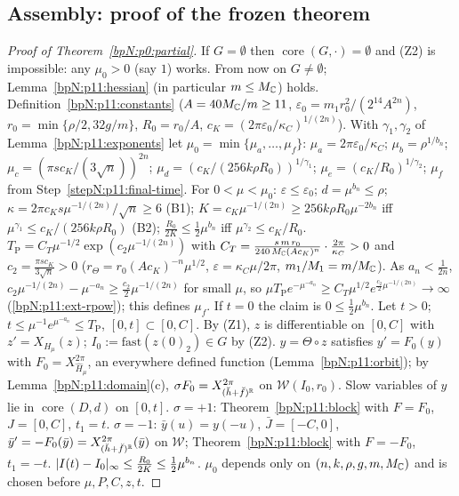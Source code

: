\subsection{Assembly: proof of the frozen theorem}\label{bpN:p11:s-final}

\begin{proof}[Proof of Theorem~\ref{bpN:p0:partial}]
\label{stepN:p11:final-empty} If $G=\emptyset$ then $\operatorname{core}(G,\cdot)=\emptyset$ and (Z2) is impossible: any $\mu_0>0$ (say $1$) works. From now on $G\ne\emptyset$; Lemma~\ref{bpN:p11:hessian} (in particular $m\le M_{\mathbb{C}}$) holds.
\label{stepN:p11:final-data} Definition~\ref{bpN:p11:constants} ($A=40M_{\mathbb{C}}/m\ge11$, $\varepsilon_0=m_1r_0^2/(2^{14}A^{2n})$, $r_0=\min\{\rho/2,32g/m\}$, $R_0=r_0/A$, $c_K=(2\pi\varepsilon_0/\kappa_C)^{1/(2n)}$).
\label{stepN:p11:final-mu} With $\gamma_1,\gamma_2$ of Lemma~\ref{bpN:p11:exponents} let $\mu_0=\min\{\mu_a,\dots,\mu_f\}$: $\mu_a=2\pi\varepsilon_0/\kappa_C$; $\mu_b=\rho^{1/b_n}$; $\mu_c=(\pi sc_K/(3\sqrt n))^{2n}$; $\mu_d=(c_K/(256k\rho R_0))^{1/\gamma_1}$; $\mu_e=(c_K/R_0)^{1/\gamma_2}$; $\mu_f$ from Step~\ref{stepN:p11:final-time}. For $0<\mu<\mu_0$: $\varepsilon\le\varepsilon_0$; $d=\mu^{b_n}\le\rho$; $\kappa=2\pi c_Ks\mu^{-1/(2n)}/\sqrt n\ge6$ (B1); $K=c_K\mu^{-1/(2n)}\ge256k\rho R_0\mu^{-2b_n}$ iff $\mu^{\gamma_1}\le c_K/(256k\rho R_0)$ (B2); $\frac{R_0}{2K}\le\frac12\mu^{b_n}$ iff $\mu^{\gamma_2}\le c_K/R_0$.
\label{stepN:p11:final-time} $T_{\mathrm P}=C_T\mu^{-1/2}\exp(c_2\mu^{-1/(2n)})$ with $C_T=\frac{s\,m\,r_0}{240\,M_{\mathbb{C}}(Ac_K)^n}\cdot\frac{2\pi}{\kappa_C}>0$ and $c_2=\frac{\pi sc_K}{3\sqrt n}>0$ ($r_\Theta=r_0(Ac_K)^{-n}\mu^{1/2}$, $\varepsilon=\kappa_C\mu/2\pi$, $m_1/M_1=m/M_{\mathbb{C}}$). As $a_n<\frac1{2n}$, $c_2\mu^{-1/(2n)}-\mu^{-a_n}\ge\frac{c_2}2\mu^{-1/(2n)}$ for small $\mu$, so $\mu T_{\mathrm P}e^{-\mu^{-a_n}}\ge C_T\mu^{1/2}e^{\frac{c_2}2\mu^{-1/(2n)}}\to\infty$ (\ref{bpN:p11:ext-rpow}); this defines $\mu_f$.
\label{stepN:p11:final-given} If $t=0$ the claim is $0\le\frac12\mu^{b_n}$. Let $t>0$; $t\le\mu^{-1}e^{\mu^{-a_n}}\le T_{\mathrm P}$, $[0,t]\subset[0,C]$.
\label{stepN:p11:final-orbit} By (Z1), $z$ is differentiable on $[0,C]$ with $z'=X_{H_\mu}(z)$; $I_0:=\mathrm{fast}(z(0)_2)\in G$ by (Z2). $y=\Theta\circ z$ satisfies $y'=F_0(y)$ with $F_0=X^{2\pi}_{\hat H_\mu}$, an everywhere defined function (Lemma~\ref{bpN:p11:orbit}); by Lemma~\ref{bpN:p11:domain}(c), $\sigma F_0=X^{2\pi}_{(\breve h+\breve f)^{\mathbb{R}}}$ on $\mathcal W(I_0,r_0)$. Slow variables of $y$ lie in $\operatorname{core}(D,d)$ on $[0,t]$.
\label{stepN:p11:final-sign} $\sigma=+1$: Theorem~\ref{bpN:p11:block} with $F=F_0$, $J=[0,C]$, $t_1=t$. $\sigma=-1$: $\bar y(u)=y(-u)$, $\bar J=[-C,0]$, $\bar y'=-F_0(\bar y)=X^{2\pi}_{(\breve h+\breve f)^{\mathbb{R}}}(\bar y)$ on $\mathcal W$; Theorem~\ref{bpN:p11:block} with $F=-F_0$, $t_1=-t$.
\label{stepN:p11:final-drift} $\lvert I(t)-I_0\rvert_\infty\le\frac{R_0}{2K}\le\frac12\mu^{b_n}$.
\label{stepN:p11:final-order} $\mu_0$ depends only on $(n,k,\rho,g,m,M_{\mathbb{C}})$ and is chosen before $\mu,P,C,z,t$.
\end{proof}

